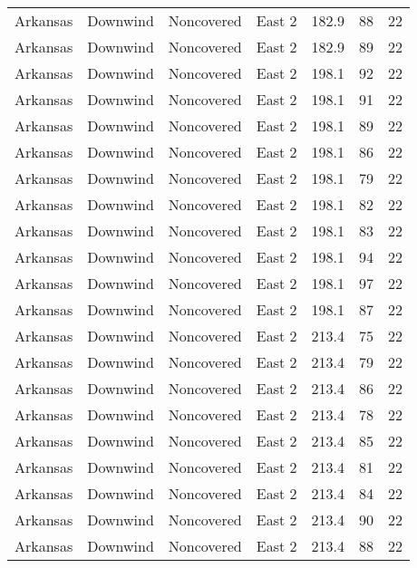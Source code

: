 \documentclass{article}
\begin{document}
\begin{longtable}[H]{ccccccc}
Arkansas & Downwind  & Noncovered & East 2        & 182.9        & 88          & 22  \\
Arkansas & Downwind  & Noncovered & East 2        & 182.9        & 89          & 22  \\
Arkansas & Downwind  & Noncovered & East 2        & 198.1        & 92          & 22  \\
Arkansas & Downwind  & Noncovered & East 2        & 198.1        & 91          & 22  \\
Arkansas & Downwind  & Noncovered & East 2        & 198.1        & 89          & 22  \\
Arkansas & Downwind  & Noncovered & East 2        & 198.1        & 86          & 22  \\
Arkansas & Downwind  & Noncovered & East 2        & 198.1        & 79          & 22  \\
Arkansas & Downwind  & Noncovered & East 2        & 198.1        & 82          & 22  \\
Arkansas & Downwind  & Noncovered & East 2        & 198.1        & 83          & 22  \\
Arkansas & Downwind  & Noncovered & East 2        & 198.1        & 94          & 22  \\
Arkansas & Downwind  & Noncovered & East 2        & 198.1        & 97          & 22  \\
Arkansas & Downwind  & Noncovered & East 2        & 198.1        & 87          & 22  \\
Arkansas & Downwind  & Noncovered & East 2        & 213.4        & 75          & 22  \\
Arkansas & Downwind  & Noncovered & East 2        & 213.4        & 79          & 22  \\
Arkansas & Downwind  & Noncovered & East 2        & 213.4        & 86          & 22  \\
Arkansas & Downwind  & Noncovered & East 2        & 213.4        & 78          & 22  \\
Arkansas & Downwind  & Noncovered & East 2        & 213.4        & 85          & 22  \\
Arkansas & Downwind  & Noncovered & East 2        & 213.4        & 81          & 22  \\
Arkansas & Downwind  & Noncovered & East 2        & 213.4        & 84          & 22  \\
Arkansas & Downwind  & Noncovered & East 2        & 213.4        & 90          & 22  \\
Arkansas & Downwind  & Noncovered & East 2        & 213.4        & 88          & 22  \\

\end{longtable}
\end{document}
